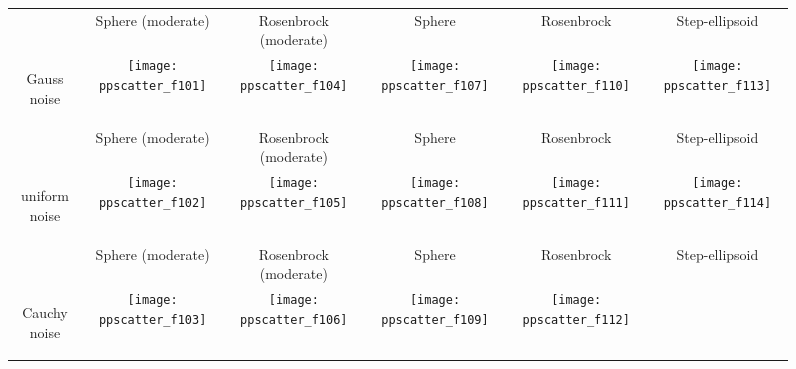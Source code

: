\documentclass{sig-alternate}
\begin{document}
\begin{figure*}
\small
\centering
\begin{tabular}{@{}c@{}*{5}{@{}c@{}}}
 & { Sphere (moderate)} & { Rosenbrock (moderate)} & { Sphere} & { Rosenbrock} & { Step-ellipsoid} \\
\begin{turn}{90}\parbox{0.175\textwidth}{\centering\sf Gauss noise}\end{turn} &
    \texttt{[image: ppscatter\_f101]}&
    \texttt{[image: ppscatter\_f104]}&
    \texttt{[image: ppscatter\_f107]}&
    \texttt{[image: ppscatter\_f110]}&
    \texttt{[image: ppscatter\_f113]}\\
 & { Sphere (moderate)} & { Rosenbrock (moderate)} & { Sphere} & { Rosenbrock} & { Step-ellipsoid}\\
\begin{turn}{90}\parbox{0.175\textwidth}{\centering\sf uniform noise}\end{turn} &
    \texttt{[image: ppscatter\_f102]}&
    \texttt{[image: ppscatter\_f105]}&
    \texttt{[image: ppscatter\_f108]}&
    \texttt{[image: ppscatter\_f111]}&
    \texttt{[image: ppscatter\_f114]}\\
 & { Sphere (moderate)} & { Rosenbrock (moderate)} & { Sphere} & { Rosenbrock} & { Step-ellipsoid}\\
\begin{turn}{90}\parbox{0.175\textwidth}{\centering\sf Cauchy noise}\end{turn} &
    \texttt{[image: ppscatter\_f103]}&
    \texttt{[image: ppscatter\_f106]}&
    \texttt{[image: ppscatter\_f109]}&
    \texttt{[image: ppscatter\_f112]}&

\end{tabular}
\end{figure*}
\end{document}
